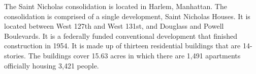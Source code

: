   

 

The Saint Nicholas consolidation is located in Harlem, Manhattan. The consolidation is comprised of a single development, Saint Nicholas Houses. It is located between West 127th and West 131st, and Douglass and Powell Boulevards. It is a federally funded conventional development that finished construction in 1954. It is made up of thirteen residential buildings that are 14-stories. The buildings cover 15.63 acres in which there are 1,491 apartments officially housing 3,421 people.  